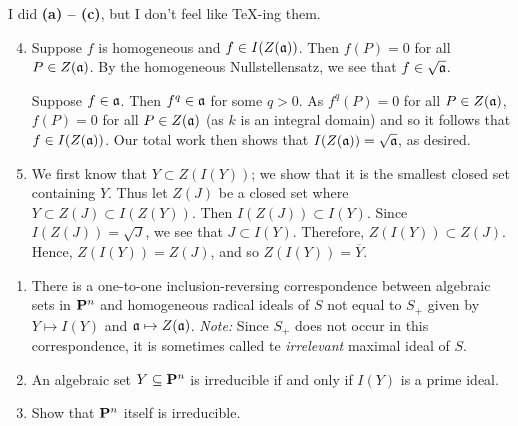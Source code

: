 \documentclass[10pt]{amsart}
\begin{document}
\begin{solution}
    \begin{luke}
        I did {\bf (a) -- (c)}, but I don't feel like \TeX-ing them.
        \begin{enumerate}
            \setcounter{enumi}{3}
            \item Suppose $f$ is homogeneous and $f \in I(Z(\mathfrak{a}))$. Then 
            $f(P) = 0$ for all $P \in Z(\mathfrak{a})$. By the homogeneous Nullstellensatz, 
            we see that $f \in \sqrt{\mathfrak{a}}$.
            
            Suppose $f \in \mathfrak{a}$. Then $f^q \in \mathfrak{a}$ for some $q > 0$. 
            As $f^q(P) = 0$ for all $P \in Z(\mathfrak{a})$, $f(P) = 0$ for all 
            $P \in Z(\mathfrak{a})$ (as $k$ is an integral domain) and so it 
            follows that $f \in I(Z(\mathfrak{a}))$.
            Our total work then shows that $I(Z(\mathfrak{a})) = \sqrt{\mathfrak{a}}$, as desired.
    
            \item
            We first know that $Y \subset Z(I(Y))$; we show that it is the smallest closed 
            set containing $Y$. Thus
            let $Z(J)$ be a closed set where $Y \subset Z(J) \subset I(Z(Y))$. 
            Then $I(Z(J)) \subset I(Y)$. Since $I(Z(J)) = \sqrt{J}$, we see that 
            $J \subset I(Y)$. Therefore, 
            $Z(I(Y)) \subset Z(J)$. Hence, $Z(I(Y)) = Z(J)$, and so $Z(I(Y)) = \overline{Y}$.  
        \end{enumerate}
    \end{luke}
\end{solution}

\begin{exercise}[2.4]
    \begin{enumerate}
        \item There is a one-to-one inclusion-reversing correspondence between
        algebraic sets in ${\bf P}^n$ and homogeneous radical ideals of $S$ not equal
        to $S_+$ given by $Y \mapsto I(Y)$ and $\mathfrak{a} \mapsto
        Z(\mathfrak{a})$. \emph{Note:} Since $S_{+}$ does not occur in this correspondence, 
        it is sometimes called te \emph{irrelevant} maximal ideal of $S$. 
        
        \item An algebraic set $Y \subseteq {\bf P}^n$ is irreducible if and only if $I(Y)$ is a prime ideal. 
        \item Show that ${\bf P}^n$ itself is irreducible. 
    \end{enumerate}
\end{exercise}
\end{document}
